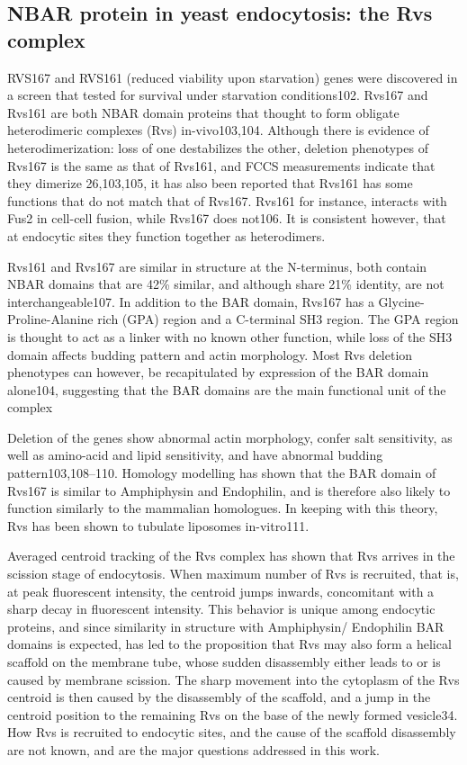 	\subsection{NBAR protein in yeast endocytosis: the Rvs complex}		
	RVS167 and RVS161 (reduced viability upon starvation) genes were discovered in a screen that tested for survival under starvation conditions102. Rvs167 and Rvs161 are both NBAR domain proteins that thought to form obligate heterodimeric complexes (Rvs) in-vivo103,104. Although there is evidence of heterodimerization: loss of one destabilizes the other, deletion phenotypes of Rvs167 is the same as that of Rvs161, and FCCS measurements indicate that they dimerize 26,103,105, it has also been reported that Rvs161 has some functions that do not match that of Rvs167. Rvs161 for instance, interacts with Fus2 in cell-cell fusion, while Rvs167 does not106. It is consistent however, that at endocytic sites they function together as heterodimers. 

		
	\vspace{5mm}
	Rvs161 and Rvs167 are similar in structure at the N-terminus, both contain NBAR domains that are 42\% similar, and although share 21\% identity, are not interchangeable107. In addition to the BAR domain, Rvs167 has a Glycine-Proline-Alanine rich (GPA) region and a C-terminal SH3 region. The GPA region is thought to act as a linker with no known other function, while loss of the SH3 domain affects budding pattern and actin morphology. Most Rvs deletion phenotypes can however, be recapitulated by expression of the BAR domain alone104, suggesting that the BAR domains are the main functional unit of the complex 

	\vspace{5mm}
	Deletion of the genes show abnormal actin morphology, confer salt sensitivity, as well as amino-acid and lipid sensitivity, and have abnormal budding pattern103,108–110. Homology modelling has shown that the BAR domain of Rvs167 is similar to Amphiphysin and Endophilin, and is therefore also likely to function similarly to the mammalian homologues. In keeping with this theory, Rvs has been shown to tubulate liposomes in-vitro111. 

		
	\vspace{5mm}
	Averaged centroid tracking of the Rvs complex has shown that Rvs arrives in the scission stage of endocytosis. When maximum number of Rvs is recruited, that is, at peak fluorescent intensity, the centroid jumps inwards, concomitant with a sharp decay in fluorescent intensity. This behavior is unique among endocytic proteins, and since similarity in structure with Amphiphysin/ Endophilin BAR domains is expected, has led to the proposition that Rvs may also form a helical scaffold on the membrane tube, whose sudden disassembly either leads to or is caused by membrane scission. The sharp movement into the cytoplasm of the Rvs centroid is then caused by the disassembly of the scaffold, and a jump in the centroid position to the remaining Rvs on the base of the newly formed vesicle34. How Rvs is recruited to endocytic sites, and the cause of the scaffold disassembly are not known, and are the major questions addressed in this work.


		

